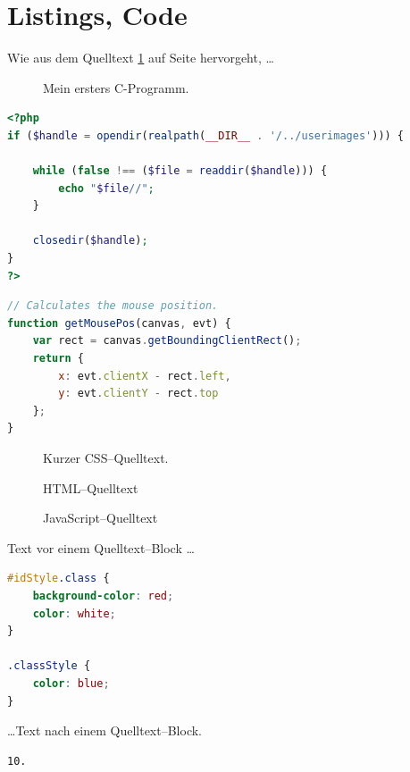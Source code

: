 \section*{Listings, Code}
Wie aus dem Quelltext \ref{code01} auf Seite \pageref{code01} hervorgeht, \ldots


\begin{figure}[H]
	
	\caption{Mein ersters C-Programm.}
  	\label{code01}
\end{figure}


\begin{lstlisting}[language=PHP]
<?php
if ($handle = opendir(realpath(__DIR__ . '/../userimages'))) {
    
    while (false !== ($file = readdir($handle))) {
        echo "$file//";
    }

    closedir($handle);
}
?>
\end{lstlisting}


\begin{lstlisting}[language=JavaScript]
// Calculates the mouse position.
function getMousePos(canvas, evt) {
	var rect = canvas.getBoundingClientRect();
	return {
		x: evt.clientX - rect.left,
		y: evt.clientY - rect.top
	};
}
\end{lstlisting}




\begin{figure}[H]
	
	\caption{Kurzer CSS--Quelltext.}
  	\label{code02}
\end{figure}


\begin{figure}[H]
	
	\caption{HTML--Quelltext}
  	\label{code03}
\end{figure}


\begin{figure}[H]
	
	\caption{JavaScript--Quelltext}
  	\label{code04}
\end{figure}

Text vor einem Quelltext--Block \ldots

\begin{lstlisting}[language=CSS]
#idStyle.class {
	background-color: red;
	color: white;
}

.classStyle {
	color: blue;
}
\end{lstlisting}

\ldots Text nach einem Quelltext--Block.


\begin{lstlisting}[language=TypoScript]
10.
\end{lstlisting}

